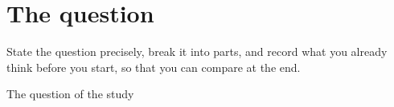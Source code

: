 \chapter{The question}

\begin{objetivo}
State the question precisely, break it into parts, and record what you already
think before you start, so that you can compare at the end.
\end{objetivo}

\begin{campo}{The question of the study}
\temaPergunta
\end{campo}

